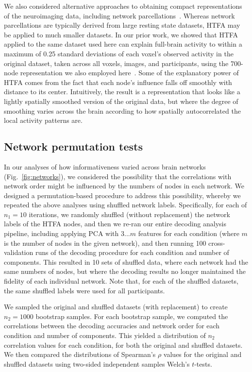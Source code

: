 \documentclass[english, 11pt]{article}
\begin{document}
We also considered alternative approaches to obtaining compact representations
of the neuroimaging data, including network
parcellations~\citep[e.g.,][]{SchaEtal18, GordEtal16}. Whereas network
parcellations are typically derived from large resting state datasets, HTFA may
be applied to much smaller datasets. In our prior work, we showed that HTFA
applied to the same dataset used here can explain full-brain activity to within
a maximum of 0.25 standard deviations of each voxel's observed activity in the
original dataset, taken across all voxels, images, and participants, using the
700-node representation we also employed here~\citep{MannEtal18}. Some of the
explanatory power of HTFA comes from the fact that each node's influence falls
off smoothly with distance to its center. Intuitively, the result is a
representation that looks like a lightly spatially smoothed version of the
original data, but where the degree of smoothing varies across the brain
according to how spatially autocorrelated the local activity patterns are.

\subsection*{Network permutation tests}

In our analyses of how informativeness varied across brain networks
(Fig.~\ref{fig:networks}), we considered the possibility that the correlations
with network order might be influenced by the numbers of nodes in each network.
We designed a permutation-based procedure to address this possibility, whereby
we repeated the above analyses using shuffled network labels. Specifically, for
each of $n_1 = 10$ iterations, we randomly shuffled (without replacement) the
network labels of the HTFA nodes, and then we re-ran our entire decoding
analysis pipeline, including applying PCA with $3...m$ features for each
condition (where $m$ is the number of nodes in the given network), and then
running 100 cross-validation runs of the decoding procedure for each condition
and number of components. This resulted in 10 sets of shuffled data, where each
network had the same numbers of nodes, but where the decoding results no longer
maintained the fidelity of each individual network. Note that, for each of the
shuffled datasets, the same shuffled labels were used for all participants.

We sampled the original and shuffled datasets (with replacement) to create $n_2
= 1000$ bootstrap samples. For each bootstrap sample, we computed the
correlations between the decoding accuracies and network order for each
condition and number of components. This yielded a distribution of $n_2$
correlation values for each condition, for both the original and shuffled
datasets. We then compared the distributions of Spearman's $\rho$ values for
the original and shuffled datasets using two-sided independent samples Welch's
$t$-tests.
\end{document}
